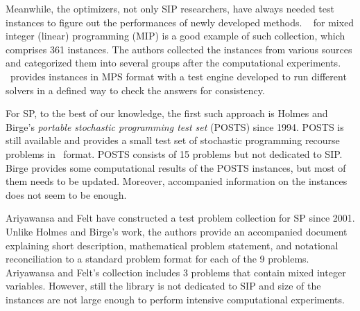 Meanwhile, the optimizers, not only SIP researchers, have always needed test instances to figure out the performances of newly developed methods. \miplib\ \cite{MIPLIB} for mixed integer (linear) programming (MIP) is a good example of such collection, which comprises 361 instances. The authors collected the instances from various sources and categorized them into several groups after the computational experiments. \miplib\ provides instances in \textsf{MPS} format with a test engine developed to run different solvers in a defined way to check the answers for consistency. 

For SP, to the best of our knowledge, the first such approach is Holmes and Birge's \textit{portable stochastic programming test set} (POSTS) \cite{POSTS} since 1994. POSTS is still available and provides a small test set of stochastic programming recourse problems in \smps\ format. POSTS consists of 15 problems but not dedicated to SIP. Birge \cite{POSTSresults} provides some computational results of the POSTS instances, but most of them needs to be updated. Moreover, accompanied information on the instances does not seem to be enough. 

Ariyawansa and Felt \cite{journal:AF2004} have constructed a test problem collection for SP since 2001. Unlike Holmes and Birge's work, the authors provide an accompanied document explaining short description, mathematical problem statement, and notational reconciliation to a standard problem format for each of the 9 problems. Ariyawansa and Felt's collection includes 3 problems that contain mixed integer variables. However, still the library is not dedicated to SIP and size of the instances are not large enough to perform intensive computational experiments. 

